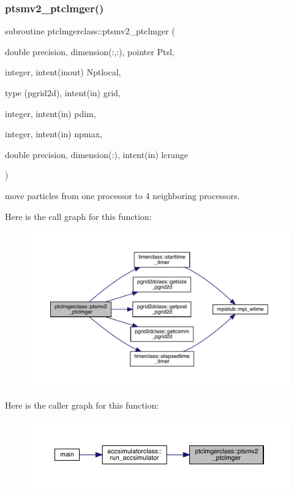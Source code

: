 \subsubsection{\texorpdfstring{ptsmv2\_ptclmger()}{ptsmv2\_ptclmger()}}
{\footnotesize\ttfamily subroutine ptclmgerclass\+::ptsmv2\+\_\+ptclmger (\begin{DoxyParamCaption}\item[{double precision, dimension(\+:,\+:), pointer}]{Ptsl,  }\item[{integer, intent(inout)}]{Nptlocal,  }\item[{type (pgrid2d), intent(in)}]{grid,  }\item[{integer, intent(in)}]{pdim,  }\item[{integer, intent(in)}]{npmax,  }\item[{double precision, dimension(\+:), intent(in)}]{lcrange }\end{DoxyParamCaption})}



move particles from one processor to 4 neighboring processors. 

Here is the call graph for this function\+:
\nopagebreak
\begin{figure}[H]
\begin{center}
\leavevmode
\includegraphics[width=350pt]{namespaceptclmgerclass_a15bfd87febad22b6f820896f8720a3d7_cgraph}
\end{center}
\end{figure}
Here is the caller graph for this function\+:
\nopagebreak
\begin{figure}[H]
\begin{center}
\leavevmode
\includegraphics[width=350pt]{namespaceptclmgerclass_a15bfd87febad22b6f820896f8720a3d7_icgraph}
\end{center}
\end{figure}
